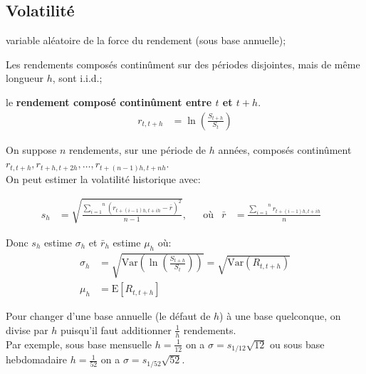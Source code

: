 \documentclass[10pt, french]{article}
\begin{document}
\begin{multicols*}{2}
	
\subsection*{Volatilité}

\begin{distributions}[Notation]
\begin{description}[leftmargin = *]
	\item[$R$]	variable aléatoire de la force du rendement (sous base annuelle);
	\item[Hypothèse]	Les rendements composés continûment sur des périodes disjointes, mais de même longueur $h$, sont i.i.d.;
	\item[$r_{t, t + h}$]	le \textbf{rendement composé continûment entre $t$ et $t + h$}.
		\begin{align*}
		r_{t, t + h} &= \ln\left(\frac{S_{t + h}}{S_{t}}\right)
		\end{align*}
\end{description}
\end{distributions}

On suppose $n$ rendements, sur une période de $h$ années, composés continûment $r_{t, t + h}, r_{t + h, t + 2h}, \dots, r_{t + (n - 1)h, t + nh}$. \\
On peut estimer la volatilité historique avec:

\begin{align*}
	s_{h}
	&=	\sqrt{\frac{\overset{n}{\underset{i = 1}{\sum}} (r_{t + (i - 1)h, t + ih} - \bar{r})^{2}}{n - 1}}, &
	&\text{où}&
	\bar{r}
	&=	\frac{\overset{n}{\underset{i = 1}{\sum}} r_{t + (i - 1)h, t + ih}}{n}	&
\end{align*}

Donc $s_{h}$ estime $\sigma_{h}$ et $\bar{r}_{h}$ estime $\mu_{h}$ où:
	\begin{align*}
	\sigma_{h}
	&=	\sqrt{\text{Var}\left(\ln\left( \frac{S_{t + h}}{S_{t}} \right)\right)}	
	=	\sqrt{\text{Var}(R_{t, t + h})}	\\
	\mu_{h}
	&=	\text{E}[R_{t, t + h}]
	\end{align*}

Pour changer d'une base annuelle (le défaut de $h$) à une base quelconque, on divise par $h$ puisqu'il faut additionner $\frac{1}{h}$ rendements. \\
Par exemple, sous base mensuelle $h = \frac{1}{12}$ on a $\sigma = s_{1/12}\sqrt{12}$ ou sous base hebdomadaire $h = \frac{1}{52}$ on a $\sigma = s_{1/52}\sqrt{52}$.


\end{multicols*}
\end{document}
